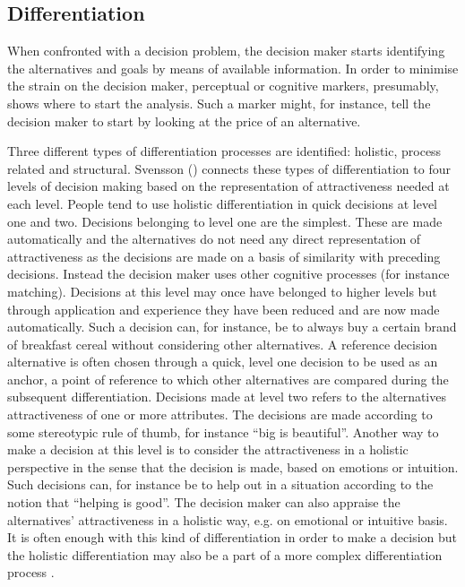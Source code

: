 \documentclass[jou,11pt]{apa6}
\begin{document}
\subsection{Differentiation}

When confronted with a decision problem, the decision maker starts
identifying the alternatives and goals by means of available
information.  In order to minimise the strain on the decision maker,
perceptual or cognitive markers, presumably, shows where to start the
analysis.  Such a marker might, for instance, tell the decision maker
to start by looking at the price of an alternative.

Three different types of differentiation processes are identified:
holistic, process related and structural.  Svensson
(\citeyear{svensson92b}) connects these types of differentiation to
four levels of decision making based on the representation of
attractiveness needed at each level.  People tend to use holistic
differentiation in quick decisions at level one and two.   Decisions
belonging to level one are the simplest.  These are made automatically
and the alternatives do not need any direct representation of
attractiveness as the decisions are made on a basis of similarity with
preceding decisions.  Instead the decision maker uses other cognitive
processes (for instance matching).  Decisions at this level may once
have belonged to higher levels but through application and experience
they have been reduced and are now made automatically.  Such a
decision can, for instance, be to always buy a certain brand of
breakfast cereal without considering other alternatives.  A reference
decision alternative is often chosen through a quick, level one
decision to be used as an anchor, a point of reference to which other
alternatives are compared during the subsequent differentiation.
Decisions made at level two refers to the alternatives attractiveness
of one or more attributes.  The decisions are made according to some
stereotypic rule of thumb, for instance ``big is beautiful''.  Another
way to make a decision at this level is to consider the attractiveness
in a holistic perspective in the sense that the decision is made,
based on emotions or intuition.  Such decisions can, for instance be
to help out in a situation according to the notion that ``helping is
good''.  The decision maker can also appraise the alternatives'
attractiveness in a holistic way, e.g. on emotional or intuitive
basis.  It is often enough with this kind of differentiation in order
to make a decision but the holistic differentiation may also be a part
of a more complex differentiation process \parencite{svensson92b,
  Svensson96}.
\end{document}
